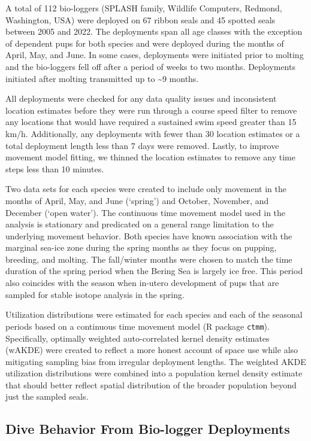 \documentclass[
  authoryear,
  preprint,
  3p,
  onecolumn]{elsarticle}
\begin{document}
A total of 112 bio-loggers (SPLASH family, Wildlife Computers, Redmond,
Washington, USA) were deployed on 67 ribbon seals and 45 spotted seals
between 2005 and 2022. The deployments span all age classes with the
exception of dependent pups for both species and were deployed during
the months of April, May, and June. In some cases, deployments were
initiated prior to molting and the bio-loggers fell off after a period
of weeks to two months. Deployments initiated after molting transmitted
up to \textasciitilde9 months.

All deployments were checked for any data quality issues and
inconsistent location estimates before they were run through a course
speed filter to remove any locations that would have required a
sustained swim speed greater than 15 km/h. Additionally, any deployments
with fewer than 30 location estimates or a total deployment length less
than 7 days were removed. Lastly, to improve movement model fitting, we
thinned the location estimates to remove any time steps less than 10
minutes.

Two data sets for each species were created to include only movement in
the months of April, May, and June (`spring') and October, November, and
December (`open water'). The continuous time movement model used in the
analysis is stationary and predicated on a general range limitation to
the underlying movement behavior. Both species have known association
with the marginal sea-ice zone during the spring months as they focus on
pupping, breeding, and molting. The fall/winter months were chosen to
match the time duration of the spring period when the Bering Sea is
largely ice free. This period also coincides with the season when
in-utero development of pups that are sampled for stable isotope
analysis in the spring.

Utilization distributions were estimated for each species and each of
the seasonal periods based on a continuous time movement model (R
package \texttt{ctmm}). Specifically, optimally weighted auto-correlated
kernel density estimates (wAKDE) were created to reflect a more honest
account of space use while also mitigating sampling bias from irregular
deployment lengths. The weighted AKDE utilization distributions were
combined into a population kernel density estimate that should better
reflect spatial distribution of the broader population beyond just the
sampled seals.

\subsection{Dive Behavior From Bio-logger
Deployments}\label{dive-behavior-from-bio-logger-deployments}
\end{document}
